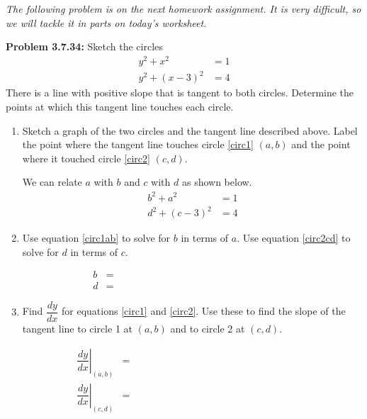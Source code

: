 \documentclass[11pt]{article}
\begin{document}
\drawtitle

\noindent \textit{The following problem is on the next homework assignment.  It
  is very difficult, so we will tackle it in parts on today's
  worksheet.}

\noindent \textbf{Problem 3.7.34:} Sketch the circles
\begin{align}
  \label{circ1}
  y^2+x^2 &= 1\\
  \label{circ2}
  y^2 + (x-3)^2 & = 4
\end{align}
There is a line with positive slope that is tangent to both circles.
Determine the points at which this tangent line touches each circle.

\begin{enumerate}
\item Sketch a graph of the two circles and the tangent line described
  above.  Label the point where the tangent line touches circle
  \ref{circ1} $(a,b)$ and the point where it touched circle
  \ref{circ2} $(c,d)$.
  
  \vfill 
  
  \newpage
  
  We can relate $a$ with $b$ and $c$ with $d$ as shown below.
  \begin{align}
    \label{circ1ab}
    b^2+a^2 &= 1\\
    \label{circ2cd}
    d^2 + (c-3)^2 & = 4
  \end{align}
  
\item Use equation \ref{circ1ab} to solve for $b$ in terms of $a$. Use
  equation \ref{circ2cd} to solve for $d$ in terms of $c$.
  
  \vfill
  \begin{align}
    \label{ba}
    b &= \hspace{3in}\\ 
    \label{dc}
    d &= \hspace{3in}
  \end{align}
  
  \newpage

\item Find $\dfrac{dy}{dx}$ for equations \ref{circ1} and
  \ref{circ2}. Use these to find the slope of the tangent line to circle 1
  at $(a,b)$ and to circle 2 at $(c,d)$.
  
  \vfill
  
  \begin{align}
    \label{slope1}
    \left.\dfrac{dy}{dx}\right|_{(a,b)} &= \hspace{3in}\\ 
    \label{slope2}
    \left.\dfrac{dy}{dx}\right|_{(c,d)} &= \hspace{3in}
  \end{align}
  

\end{enumerate}
\end{document}
